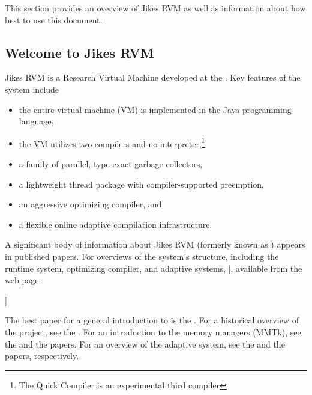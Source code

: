 This section provides an overview of Jikes\TMweb{} RVM as well as
information about how best to use this document.

\subsection{Welcome to Jikes RVM}

Jikes\TMboth{} RVM is a Research Virtual Machine 
 developed at the 
\Rboth{}
.  Key
features of the system include
\begin{itemize}
\item the entire virtual machine (VM) is implemented in the
  Java\TMboth{} programming language,
\item the VM utilizes two compilers and no interpreter,\footnote{The
Quick Compiler is an experimental third compiler}
\item a family of parallel, type-exact garbage collectors,
\item a lightweight thread package with compiler-supported preemption,
\item an aggressive optimizing compiler, and 
\item a flexible online adaptive compilation infrastructure.
\end{itemize}

A significant body of information about Jikes RVM 
(formerly known as 
\xlink{\jp}{\JalapenoHomeURL}) appears 
in published
papers.  For overviews of the system's structure, including the runtime system,
optimizing compiler, and adaptive systems, [, available from the \jrvm{} web page:
\begin{quote}
\texttt{\RVMPubsURL}
\end{quote}
]{\RVMPubsURL}

The best paper for a general introduction to \jrvm{} is the 
.  
For a historical overview of the project, see the
.
%
For an introduction to the memory managers (MMTk), see the 
and the
papers.
For an overview of the adaptive system, see the
and the
papers, respectively.

